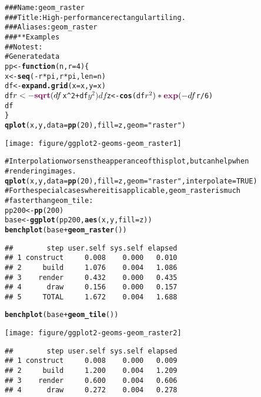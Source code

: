 \documentclass[a4paper,titlepage]{tufte-handout}\usepackage{graphicx, color}
\makeatletter
\def\maxwidth{ %
  \ifdim\Gin@nat@width>\linewidth
    \linewidth
  \else
    \Gin@nat@width
  \fi
}
\newcommand{\hlfunctioncall}[1]{\textcolor[rgb]{0.501960784313725,0,0.329411764705882}{\textbf{#1}}}%
\newcommand{\hlstring}[1]{\textcolor[rgb]{0.6,0.6,1}{#1}}%
\newcommand{\hlcomment}[1]{\textcolor[rgb]{0.180392156862745,0.6,0.341176470588235}{#1}}%
\newenvironment{kframe}{%
 \def\at@end@of@kframe{}%
 \ifinner\ifhmode%
  \def\at@end@of@kframe{\end{minipage}}%
  \begin{minipage}{\columnwidth}%
 \fi\fi%
 \def\FrameCommand##1{\hskip\@totalleftmargin \hskip-\fboxsep
 \colorbox{shadecolor}{##1}\hskip-\fboxsep
     \hskip-\linewidth \hskip-\@totalleftmargin \hskip\columnwidth}%
 \MakeFramed {\advance\hsize-\width
   \@totalleftmargin\z@ \linewidth\hsize
   \@setminipage}}%
 {\par\unskip\endMakeFramed%
 \at@end@of@kframe}
\newenvironment{knitrout}{}{} %
\makeatother
\begin{document}
\begin{knitrout}
\color{fgcolor}\begin{kframe}
\begin{alltt}
\hlcomment{### Name: geom_raster}
\hlcomment{### Title: High-performance rectangular tiling.}
\hlcomment{### Aliases: geom_raster}
\hlcomment{### ** Examples}
\hlcomment{## No test: }
\hlcomment{# Generate data}
pp <- \hlfunctioncall{function} (n,r=4) \{
 x <- \hlfunctioncall{seq}(-r*pi, r*pi, len=n)
 df <- \hlfunctioncall{expand.grid}(x=x, y=x)
 df$r <- \hlfunctioncall{sqrt}(df$x^2 + df$y^2)
 df$z <- \hlfunctioncall{cos}(df$r^2)*\hlfunctioncall{exp}(-df$r/6)
 df
\}
\hlfunctioncall{qplot}(x, y, data = \hlfunctioncall{pp}(20), fill = z, geom = \hlstring{"raster"})
\end{alltt}
\end{kframe}\texttt{[image: figure/ggplot2-geoms-geom\_raster1]} \begin{kframe}\begin{alltt}
\hlcomment{# Interpolation worsens the apperance of this plot, but can help when}
\hlcomment{# rendering images.}
\hlfunctioncall{qplot}(x, y, data = \hlfunctioncall{pp}(20), fill = z, geom = \hlstring{"raster"}, interpolate = TRUE)
\hlcomment{# For the special cases where it is applicable, geom_raster is much}
\hlcomment{# faster than geom_tile:}
pp200 <- \hlfunctioncall{pp}(200)
base <- \hlfunctioncall{ggplot}(pp200, \hlfunctioncall{aes}(x, y, fill = z))
\hlfunctioncall{benchplot}(base + \hlfunctioncall{geom_raster}())
\end{alltt}
\begin{verbatim}
##        step user.self sys.self elapsed
## 1 construct     0.008    0.000   0.010
## 2     build     1.076    0.004   1.086
## 3    render     0.432    0.000   0.435
## 4      draw     0.156    0.000   0.157
## 5     TOTAL     1.672    0.004   1.688
\end{verbatim}
\begin{alltt}
\hlfunctioncall{benchplot}(base + \hlfunctioncall{geom_tile}())
\end{alltt}
\end{kframe}\texttt{[image: figure/ggplot2-geoms-geom\_raster2]} \begin{kframe}\begin{verbatim}
##        step user.self sys.self elapsed
## 1 construct     0.008    0.000   0.009
## 2     build     1.200    0.004   1.209
## 3    render     0.600    0.004   0.606
## 4      draw     0.272    0.004   0.278

\end{verbatim}
\end{kframe}
\end{knitrout}
\end{document}
